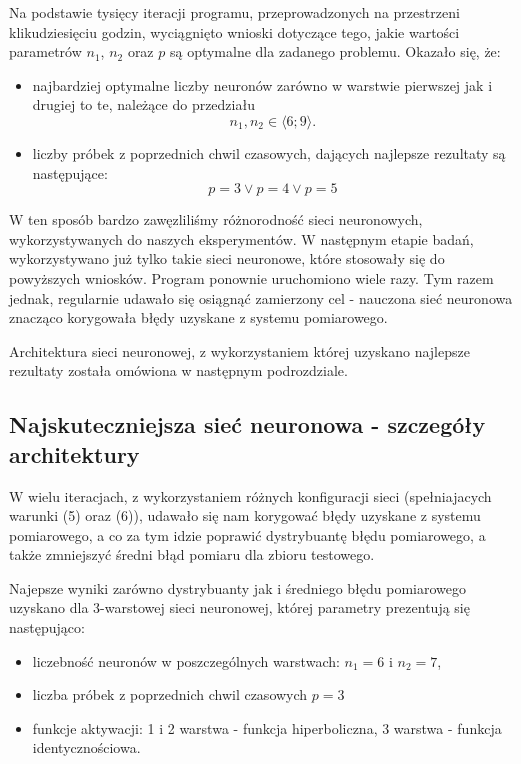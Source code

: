 \documentclass{classrep}
\begin{document}
Na podstawie tysięcy iteracji programu, przeprowadzonych na przestrzeni klikudziesięciu godzin, wyciągnięto wnioski dotyczące tego, jakie wartości parametrów $n_1$, $n_2$ oraz $p$ są optymalne dla zadanego problemu. Okazało się, że:
\begin{itemize}[label=$\bullet$\scshape\bfseries]

\item najbardziej optymalne liczby neuronów zarówno w warstwie pierwszej jak i drugiej to te, należące do przedziału 
\begin{equation}
n_1, n_2 \in \langle6; 9\rangle.
\end{equation}

\item liczby próbek z poprzednich chwil czasowych, dających najlepsze rezultaty są następujące:
\begin{equation}
p=3  \lor p=4 \lor p=5
\end{equation}
\end{itemize}

W ten sposób bardzo zawęzliliśmy różnorodność sieci neuronowych, wykorzystywanych do naszych eksperymentów. W następnym etapie badań, wykorzystywano już tylko takie sieci neuronowe, które stosowały się do powyższych wniosków. Program ponownie uruchomiono wiele razy. Tym razem jednak, regularnie udawało się osiągnąć zamierzony cel - nauczona sieć neuronowa znacząco korygowała błędy uzyskane z systemu pomiarowego.\newline

Architektura sieci neuronowej, z wykorzystaniem której uzyskano najlepsze rezultaty została omówiona w następnym podrozdziale.

\subsection{Najskuteczniejsza sieć neuronowa - szczegóły architektury}

W wielu iteracjach, z wykorzystaniem różnych konfiguracji sieci (spełniajacych warunki (5) oraz (6)), udawało się nam korygować błędy uzyskane z systemu pomiarowego, a co za tym idzie poprawić dystrybuantę błędu pomiarowego, a także zmniejszyć średni błąd pomiaru dla zbioru testowego.\newline

Najepsze wyniki zarówno dystrybuanty jak i średniego błędu pomiarowego uzyskano dla 3-warstowej sieci neuronowej, której parametry prezentują się następująco:

\begin{itemize}[label=$\bullet$\scshape\bfseries]
\item liczebność neuronów w poszczególnych warstwach: $n_1 = 6$ i $n_2 = 7$,
\item liczba próbek z poprzednich chwil czasowych $p = 3$
\item funkcje aktywacji: 1 i 2 warstwa - funkcja hiperboliczna, 3 warstwa - funkcja identycznościowa.
\end{itemize}
\end{document}

